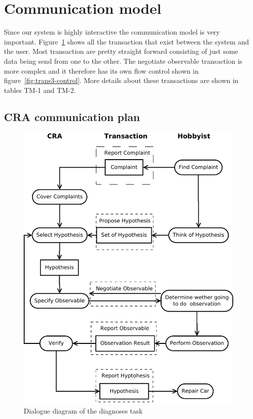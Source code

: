 \section{Communication model}
Since our system is highly interactive the communication model is very important. Figure~\ref{fig:dialogueDiagram} shows all the transaction that exist between the system and the user. Most transaction are pretty straight forward consisting of just some data being send from one to the other. The negotiate observable transaction is more complex and it therefore has its own flow control shown in figure~\ref{fig:trans3-control}. More details about these transactions are shown in tables TM-1 and TM-2.

\subsection{CRA communication plan}
\begin{figure}[htbp]
    \centering
    \includegraphics[width=1.00\textwidth]{dialogueDiagram.pdf}
    \caption{Dialogue diagram of the diagnoses task}
    \label{fig:dialogueDiagram}
\end{figure}

